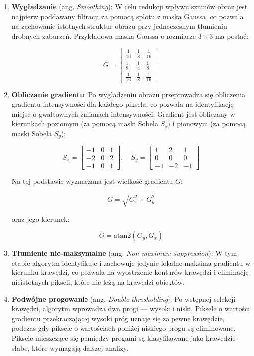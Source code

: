 \begin{enumerate}
    \item \textbf{Wygładzanie} (ang. \textit{Smoothing}): W celu redukcji wpływu szumów obraz jest najpierw poddawany filtracji za pomocą splotu z maską Gaussa, co pozwala na zachowanie istotnych struktur obrazu przy jednoczesnym tłumieniu drobnych zaburzeń. Przykładowa maska Gaussa o rozmiarze \(3 \times 3\) ma postać:

    \[
    G = \begin{bmatrix}
    \frac{1}{16} & \frac{1}{8} & \frac{1}{16} \\
    \frac{1}{8} & \frac{1}{4} & \frac{1}{8} \\
    \frac{1}{16} & \frac{1}{8} & \frac{1}{16}
    \end{bmatrix}
    \]

    \item \textbf{Obliczanie gradientu}: Po wygładzeniu obrazu przeprowadza się obliczenia gradientu intensywności dla każdego piksela, co pozwala na identyfikację miejsc o gwałtownych zmianach intensywności. Gradient jest obliczany w kierunkach poziomym (za pomocą maski Sobela \(S_x\)) i pionowym (za pomocą maski Sobela \(S_y\)):

    \[
    S_x = \begin{bmatrix}
    -1 & 0 & 1 \\
    -2 & 0 & 2 \\
    -1 & 0 & 1
    \end{bmatrix}, \quad 
    S_y = \begin{bmatrix}
    1 & 2 & 1 \\
    0 & 0 & 0 \\
    -1 & -2 & -1
    \end{bmatrix}
    \]

    Na tej podstawie wyznaczana jest wielkość gradientu \(G\):

    \[
    G = \sqrt{G_x^2 + G_y^2}
    \]

    oraz jego kierunek:

    \[
    \Theta = \text{atan2}(G_y, G_x)
    \]

    \item \textbf{Tłumienie nie-maksymalne} (ang. \textit{Non-maximum suppression}): W tym etapie algorytm identyfikuje i zachowuje jedynie lokalne maksima gradientu w kierunku krawędzi, co pozwala na wyostrzenie konturów krawędzi i eliminację nieistotnych pikseli, które nie leżą na krawędzi obiektów.

    \item \textbf{Podwójne progowanie} (ang. \textit{Double thresholding}): Po wstępnej selekcji krawędzi, algorytm wprowadza dwa progi — wysoki i niski. Piksele o wartości gradientu przekraczającej wysoki próg uznaje się za pewne krawędzie, podczas gdy piksele o wartościach poniżej niskiego progu są eliminowane. Piksele mieszczące się pomiędzy progami są klasyfikowane jako krawędzie słabe, które wymagają dalszej analizy.


\end{enumerate}
